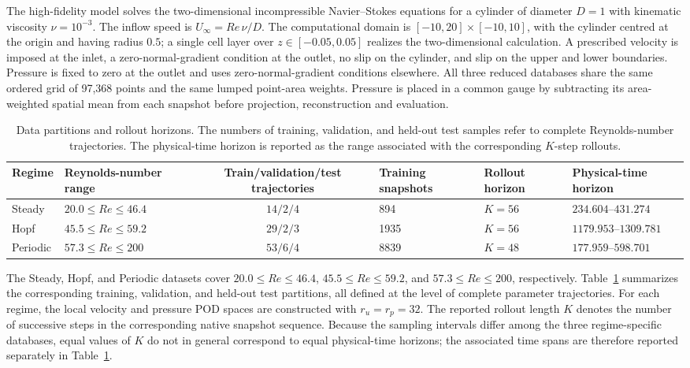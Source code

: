 The high-fidelity model solves the two-dimensional incompressible
Navier--Stokes equations for a cylinder of diameter $D=1$ with kinematic
viscosity $\nu=10^{-3}$.  The inflow speed is
$U_\infty=Re\,\nu/D$.  The computational domain is
$[-10,20]\times[-10,10]$, with the cylinder centred at the origin and having
radius $0.5$; a single cell layer over
$z\in[-0.05,0.05]$ realizes the two-dimensional calculation.  A prescribed
velocity is imposed at the inlet, a zero-normal-gradient condition at the
outlet, no slip on the cylinder, and slip on the upper and lower boundaries.
Pressure is fixed to zero at the outlet and uses zero-normal-gradient
conditions elsewhere.  All three reduced databases share the same ordered
grid of 97,368 points and the same lumped point-area weights.  Pressure is
placed in a common gauge by subtracting its area-weighted spatial mean from
each snapshot before projection, reconstruction and evaluation.
\begin{table}[htbp]
\centering
\caption{Data partitions and rollout horizons.
The numbers of training, validation, and held-out test samples refer to
complete Reynolds-number trajectories. The physical-time horizon is reported
as the range associated with the corresponding $K$-step rollouts.}
\label{tab:cylinder_data_contracts}

\scriptsize
\begin{adjustbox}{max width=\textwidth}
\begin{tabular}{@{}p{}p{}c
                p{}p{}p{}@{}}
\toprule
Regime
& Reynolds-number range
& Train/validation/test trajectories
& Training snapshots
& Rollout horizon
& Physical-time horizon \\
\midrule

Steady
& $20.0 \le Re \le 46.4$
& $14/2/4$
& 894
& $K=56$
& $234.604$--$431.274$ \\

Hopf
& $45.5 \le Re \le 59.2$
& $29/2/3$
& 1935
& $K=56$
& $1179.953$--$1309.781$ \\

Periodic
& $57.3 \le Re \le 200$
& $53/6/4$
& 8839
& $K=48$
& $177.959$--$598.701$ \\

\bottomrule
\end{tabular}
\end{adjustbox}
\end{table}
The Steady, Hopf, and Periodic datasets cover
$20.0\le Re\le46.4$, $45.5\le Re\le59.2$, and
$57.3\le Re\le200$, respectively.
Table~\ref{tab:cylinder_data_contracts} summarizes the corresponding
training, validation, and held-out test partitions, all defined at the level
of complete parameter trajectories. For each regime, the local velocity and pressure POD spaces are constructed
with $r_u=r_p=32$. The reported rollout length $K$ denotes the number of successive steps in the
corresponding native snapshot sequence. Because the sampling intervals differ
among the three regime-specific databases, equal values of $K$ do not in
general correspond to equal physical-time horizons; the associated time spans
are therefore reported separately in
Table~\ref{tab:cylinder_data_contracts}.


